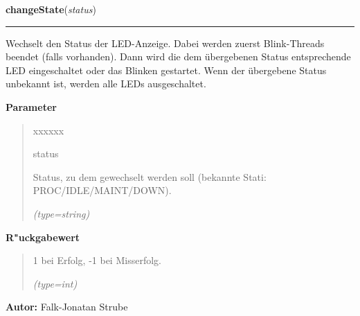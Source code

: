 \hspace{.8\funcindent}\begin{boxedminipage}{\funcwidth}

    \raggedright \textbf{changeState}(\textit{status})

    \vspace{-1.5ex}

    \rule{\textwidth}{0.5\fboxrule}
\setlength{\parskip}{2ex}
    Wechselt den Status der LED-Anzeige. Dabei werden zuerst Blink-Threads 
    beendet (falls vorhanden). Dann wird die dem übergebenen Status 
    entsprechende LED eingeschaltet oder das Blinken gestartet. Wenn der 
    übergebene Status unbekannt ist, werden alle LEDs ausgeschaltet.

\setlength{\parskip}{1ex}
      \textbf{Parameter}
      \vspace{-1ex}

      \begin{quote}
        \begin{Ventry}{xxxxxx}

          \item[status]

          Status, zu dem gewechselt werden soll (bekannte Stati: 
          PROC/IDLE/MAINT/DOWN).

            {\it (type=string)}

        \end{Ventry}

      \end{quote}

      \textbf{R"uckgabewert}
    \vspace{-1ex}

      \begin{quote}
      1 bei Erfolg, -1 bei Misserfolg.

      {\it (type=int)}

      \end{quote}

\textbf{Autor:} Falk-Jonatan Strube



    \end{boxedminipage}

    \label{ledleuchtturm:ledFunc:setLEDsGlobal}

    \vspace{0.5ex}

